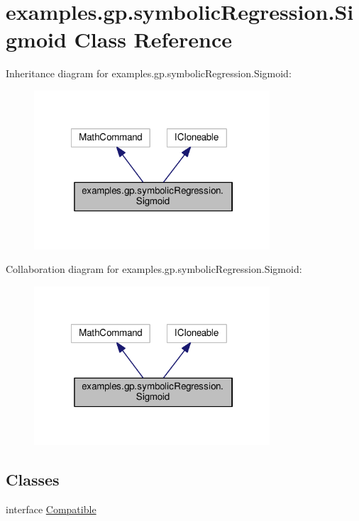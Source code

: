 \hypertarget{classexamples_1_1gp_1_1symbolic_regression_1_1_sigmoid}{\section{examples.\-gp.\-symbolic\-Regression.\-Sigmoid Class Reference}
\label{classexamples_1_1gp_1_1symbolic_regression_1_1_sigmoid}
}


Inheritance diagram for examples.\-gp.\-symbolic\-Regression.\-Sigmoid\-:
\nopagebreak
\begin{figure}[H]
\begin{center}
\leavevmode
\includegraphics[width=249pt]{classexamples_1_1gp_1_1symbolic_regression_1_1_sigmoid__inherit__graph}
\end{center}
\end{figure}


Collaboration diagram for examples.\-gp.\-symbolic\-Regression.\-Sigmoid\-:
\nopagebreak
\begin{figure}[H]
\begin{center}
\leavevmode
\includegraphics[width=249pt]{classexamples_1_1gp_1_1symbolic_regression_1_1_sigmoid__coll__graph}
\end{center}
\end{figure}
\subsection*{Classes}
\begin{DoxyCompactItemize}
\item 
interface \hyperlink{interfaceexamples_1_1gp_1_1symbolic_regression_1_1_sigmoid_1_1_compatible}{Compatible}
\end{DoxyCompactItemize}
